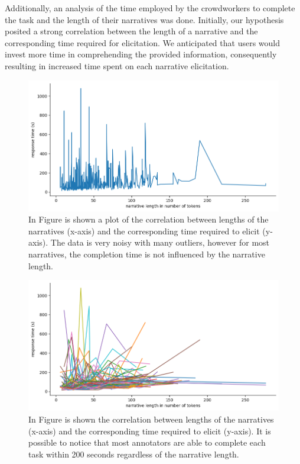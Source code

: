 Additionally, an analysis of the time employed by the crowdworkers to complete the task and the length of their narratives was done. Initially, our hypothesis posited a strong correlation between the length of a narrative and the corresponding time required for elicitation. We anticipated that users would invest more time in comprehending the provided information, consequently resulting in increased time spent on each narrative elicitation.
\begin{figure}[!htbp]
    \centering
    \includegraphics[width=1\linewidth]{assets//imgs/dataset-pearson-correlation.png}
    \caption{In Figure is shown a plot of the correlation between lengths of the narratives (x-axis) and the corresponding time required to elicit (y-axis). The data is very noisy with many outliers, however for most narratives, the completion time is not influenced by the narrative length.}
    \label{fig:dataset-pearson-correlation}
\end{figure}
\begin{figure}[!htbp]
    \centering
        \includegraphics[width=1\linewidth]{assets//imgs/dataset-overall-correlation-workers.png}
        \caption{In Figure is shown the correlation between lengths of the narratives (x-axis) and the corresponding time required to elicit (y-axis). It is possible to notice that most annotators are able to complete each  task within 200 seconds regardless of the narrative length.}
        \label{fig:dataset-overall-correlation-workers}
\end{figure}

